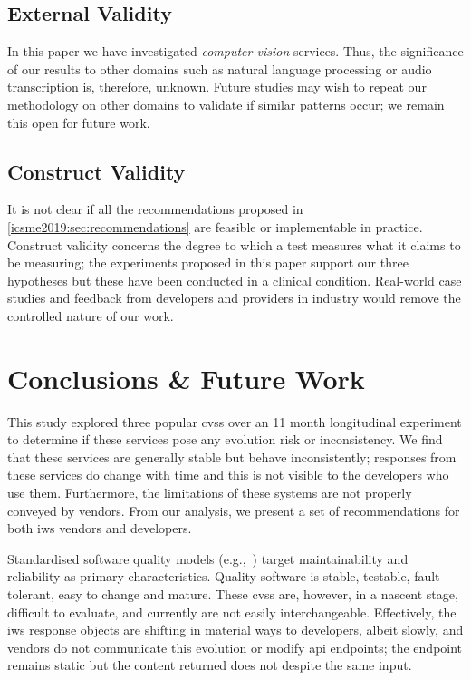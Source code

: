 \subsection{External Validity}

In this paper we have investigated \textit{computer vision} services. Thus, the significance of our results to other domains such as natural language processing or audio transcription is, therefore, unknown. Future studies may wish to repeat our methodology on other domains to validate if similar patterns occur; we remain this open for future work.

\subsection{Construct Validity}

It is not clear if all the recommendations proposed in \cref{icsme2019:sec:recommendations}  are feasible or implementable in practice. Construct validity concerns the degree to which a test measures what it claims to be measuring; the experiments proposed in this paper support our three hypotheses but these have been conducted in a clinical condition. Real-world case studies and feedback from developers and providers in industry would remove the controlled nature of our work.

\section{Conclusions \& Future Work}
\label{icsme2019:sec:conclusions}

This study explored three popular \glspl{cvs} over an 11 month longitudinal experiment to determine if these services pose any evolution risk or inconsistency. We find that these services are generally stable but behave inconsistently; responses from these services do change with time and this is not visible to the developers who use them. Furthermore, the limitations of these systems are not properly conveyed by vendors. From our analysis, we present a set of recommendations for both \gls{iws} vendors and developers.

Standardised software quality models (e.g.,~\citep{ISO9126:1999}) target maintainability and reliability as primary characteristics. Quality software is stable, testable, fault tolerant, easy to change and mature. These \glspl{cvs} are, however, in a nascent stage, difficult to evaluate, and currently are not easily interchangeable. Effectively, the \gls{iws} response objects are shifting in material ways to developers, albeit slowly, and vendors do not  communicate this evolution or modify \gls{api} endpoints; the endpoint remains static but the content returned does not despite the same input.


